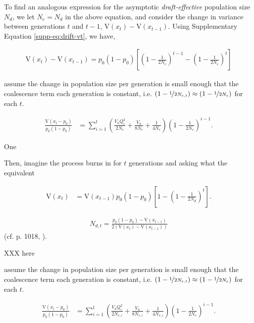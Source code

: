 \documentclass[11pt]{article}
\newcommand{\V}{\text{V}}
\newcommand{\V}{\text{V}}
\begin{document}
To find an analogous expression for the asymptotic \emph{draft-effective}
population size $N_d$, we let $N_e = N_d$ in the above equation, and consider
the change in variance between generations $t$ and $t-1$, $\V(x_t) -
\V(x_{t-1})$. Using Supplementary Equation \eqref{supp-eq:drift-vt}, we have,


\begin{align}
    \V(x_t) - \V(x_{t-1}) = p_0(1-p_0) \left[ \left(1 - \frac{1}{2N_e}\right)^{t-1} - \left(1 - \frac{1}{2N_e}\right)^t  \right]
\end{align}

\textcite{Santiago1995-hx} assume the change in population size per generation
is small enough that the coalescence term each generation is constant, i.e. $(1
- \nicefrac{1}{2N_{e,t}}) \approx (1 - \nicefrac{1}{2N_e})$ for each $t$.

\begin{align}
    \frac{\V(x_t - p_0)}{p_0(1-p_0)} &= \sum_{i=1}^t \left(\frac{V_h Q_i^2}{2 N_e} + \frac{V_n}{8N_e} + \frac{1}{4N_e} \right)\left(1-\frac{1}{2 N_{e}}\right)^{i-1}.
\end{align}





One 

Then, imagine the process burns in for $t$ generations and asking what the
equivalent 

\begin{align}
    \V(x_t) &= \V(x_{t-1}) 

  p_0(1-p_0) \left[1 - \left(1 - \frac{1}{2N_d}\right)^t \right].
\end{align}


\begin{align}
  \label{eqn:ne_var}
  N_{d,t} = \frac{p_0(1-p_0) - \V(x_{t-1})}{2(\V(x_t) - \V(x_{t-1}))}
\end{align}
%
(cf. p. 1018, \cite{Santiago1995-hx}). 

XXX here


\textcite{Santiago1995-hx} assume the change in population size per generation
is small enough that the coalescence term each generation is constant, i.e. $(1
- \nicefrac{1}{2N_{e,t}}) \approx (1 - \nicefrac{1}{2N_e})$ for each $t$.

\begin{align}
    \frac{\V(x_t - p_0)}{p_0(1-p_0)} &= \sum_{i=1}^t \left(\frac{V_h Q_i^2}{2 N_{e,i}} + \frac{V_n}{8N_{e,i}} + \frac{1}{4N_{e,i}} \right)\left(1-\frac{1}{2 N_{e}}\right)^{i-1}.
\end{align}
\end{document}
